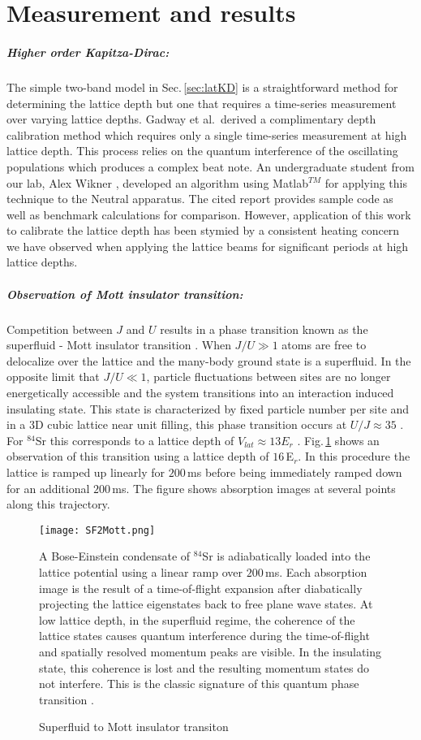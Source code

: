 \section{Measurement and results}
\subparagraph{Higher order Kapitza-Dirac:}
The simple two-band model in Sec.\,\ref{sec:latKD} is a straightforward method for determining the lattice depth but one that requires a time-series measurement over varying lattice depths.
Gadway et al.\,\cite{Gadway2009} derived a complimentary depth calibration method which requires only a single time-series measurement at high lattice depth.
This process relies on the quantum interference of the oscillating populations which produces a complex beat note.
An undergraduate student from our lab, Alex Wikner \cite{Wikner2017}, developed an algorithm using Matlab$^{TM}$ for applying this technique to the Neutral apparatus.
The cited report provides sample code as well as benchmark calculations for comparison.
However, application of this work to calibrate the lattice depth has been stymied by a consistent heating concern we have observed when applying the lattice beams for significant periods at high lattice depths.

\subparagraph{Observation of Mott insulator transition:}
Competition between $J$ and $U$ results in a phase transition known as the superfluid - Mott insulator transition \cite{Fisher1989,gme02}.
When $J/U \gg 1$ atoms are free to delocalize over the lattice and the many-body ground state is a superfluid.
In the opposite limit that $J/U \ll 1$, particle fluctuations between sites are no longer energetically accessible and the system transitions into an interaction induced insulating state.
This state is characterized by fixed particle number per site and in a 3D cubic lattice near unit filling, this phase transition occurs at $U/J \approx 35$ \cite{Blakie2004}.
For $^{84}$Sr this corresponds to a lattice depth of $V_{lat} \approx 13E_r$ \cite{Fisher1989}.
Fig.\,\ref{fig:mottSFTransition} shows an observation of this transition using a lattice depth of $16$\,E$_r$.
In this procedure the lattice is ramped up linearly for $200\,$ms before being immediately ramped down for an additional $200\,$ms.
The figure shows absorption images at several points along this trajectory.
	\begin{figure} 
		\centerline{
		\texttt{[image: SF2Mott.png]}}
		\caption{Superfluid to Mott insulator transiton}{A Bose-Einstein condensate of $^{84}$Sr is adiabatically loaded into the lattice potential using a linear ramp over $200$\,ms. Each absorption image is the result of a time-of-flight expansion after diabatically projecting the lattice eigenstates back to free plane wave states. At low lattice depth, in the superfluid regime, the coherence of the lattice states causes quantum interference during the time-of-flight and spatially resolved momentum peaks are visible. In the insulating state, this coherence is lost and the resulting momentum states do not interfere. This is the classic signature of this quantum phase transition \cite{gme02,gmh02}.}
		\label{fig:mottSFTransition}
	\end{figure}


